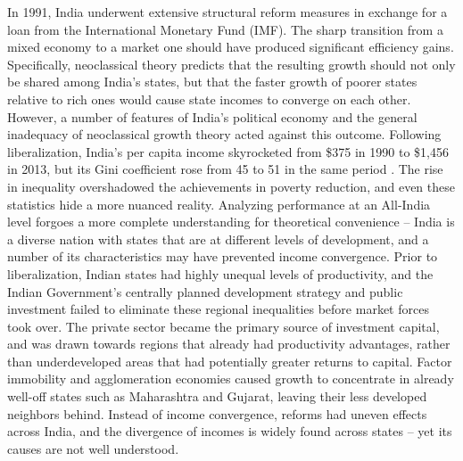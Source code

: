 \documentclass[a4paper, 11pt]{article}
\begin{document}
In 1991, India underwent extensive structural reform measures in exchange for a loan from the International Monetary Fund (IMF).  The sharp transition from a mixed economy to a market one should have produced significant efficiency gains.  Specifically, neoclassical theory predicts that the resulting growth should not only be shared among India's states, but that the faster growth of poorer states relative to rich ones would cause state incomes to converge on each other.  However, a number of features of India's political economy and the general inadequacy of neoclassical growth theory acted against this outcome.  Following liberalization, India's per capita income skyrocketed from \$375 in 1990 to \$1,456 in 2013, but its Gini coefficient rose from 45 to 51 in the same period \citep{jain2016sharing}.  The rise in inequality overshadowed the achievements in poverty reduction, and even these statistics hide a more nuanced reality.  Analyzing performance at an All-India level forgoes a more complete understanding for theoretical convenience -- India is a diverse nation with states that are at different levels of development, and a number of its characteristics may have prevented income convergence.  Prior to liberalization, Indian states had highly unequal levels of productivity, and the Indian Government's  centrally planned development strategy and public investment failed to eliminate these regional inequalities before market forces took over.  The private sector became the primary source of investment capital, and was drawn towards regions that already had productivity advantages, rather than underdeveloped areas that had potentially greater returns to capital.  Factor immobility and agglomeration economies caused growth to concentrate in already well-off states such as Maharashtra and Gujarat, leaving their less developed neighbors behind.  Instead of income convergence, reforms had uneven effects across India, and the divergence of incomes is widely found across states -- yet its causes are not well understood.  \par
\end{document}
